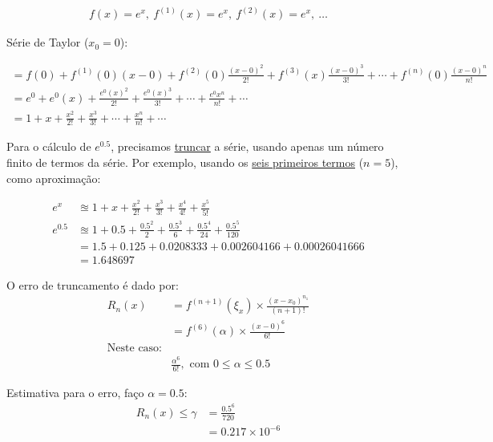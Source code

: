 \documentclass{article}
\begin{document}
            \begin{gather*}
                f(x) = e^x,~f^{(1)}(x) = e^x,~f^{(2)}(x) = e^x,~\ldots
            \end{gather*}

            Série de Taylor ($x_0 = 0$):

            \begin{gather*}
                = f(0) + f^{(1)}(0)(x - 0) + f^{(2)}(0)\frac{{(x - 0)}^2}{2!} + f^{(3)}(x)\frac{{(x - 0)}^3}{3!} + \cdots + f^{(n)}(0)\frac{{(x-0)}^n}{n!}\\
                = e^0 + e^0(x) + \frac{e^0{(x)}^2}{2!} + \frac{e^0{(x)}^3}{3!} + \cdots + \frac{e^0x^n}{n!} + \cdots\\
                = 1 + x + \frac{x^2}{2!} + \frac{x^3}{3!} + \cdots + \frac{x^n}{n!} + \cdots
            \end{gather*}

            Para o cálculo de $e^{0.5}$, precisamos \underline{truncar} a série, usando apenas um número finito de termos da série. Por exemplo, usando os \underline{seis primeiros termos} ($n = 5$), como aproximação:

            \begin{align*}
                e^x &\approxeq 1 + x + \frac{x^2}{2!} + \frac{x^3}{3!} + \frac{x^4}{4!} + \frac{x^5}{5!}\\
                e^{0.5} &\approxeq 1 + 0.5 + \frac{0.5^2}{2} + \frac{0.5^3}{6} + \frac{0.5^4}{24} + \frac{0.5^5}{120}\\
                &= 1.5 + 0.125 + 0.0208333 + 0.002604166 + 0.00026041666\\
                &= 1.648697
            \end{align*}

            O erro de truncamento é dado por:
            \begin{align*}
            R_n(x) &= f^{(n+1)}(\xi_x) \times \frac{{(x - x_0)}^{n_1}}{(n+1)!}\\
            &= f^{(6)}(\alpha) \times \frac{{(x - 0)}^6}{6!}\\
			\text{Neste caso:}&\\
			&\frac{\alpha^6}{6!},\text{ com }0 \leq \alpha \leq 0.5
            \end{align*}

            Estimativa para o erro, faço $\alpha = 0.5$:
			\begin{align*}
				R_n(x) \leq \gamma &= \frac{0.5^6}{720}\\
				&= 0.217 \times 10^{-6}
			\end{align*}
\end{document}
